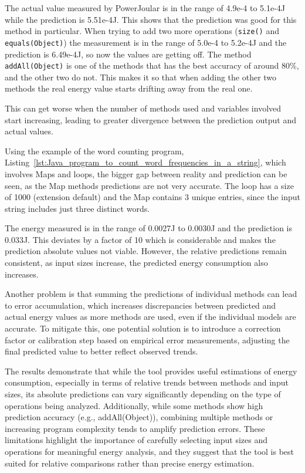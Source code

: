 The actual value measured by PowerJoular is in the range of 4.9e-4 to 5.1e-4J while the prediction is 5.51e-4J. This shows that the prediction was good for this method in particular.
When trying to add two more operations (\texttt{size()} and \texttt{equals(Object)}) the measurement is in the range of 5.0e-4 to 5.2e-4J and the prediction is 6.49e-4J, so now the values are getting off. The method \texttt{addAll(Object)} is one of the methods that has the best accuracy of around 80\%, and the other two do not. This makes it so that when adding the other two methods the real energy value starts drifting away from the real one.

This can get worse when the number of methods used and variables involved start increasing, leading to greater divergence between the prediction output and actual values. 

Using the example of the word counting program, Listing~\ref{lst:Java_program_to_count_word_frequencies_in_a_string}, which involves Maps and loops, the bigger gap between reality and prediction can be seen, as the Map methods predictions are not very accurate. The loop has a size of 1000 (extension default) and the Map contains 3 unique entries, since the input string includes just three distinct words.

The energy measured is in the range of 0.0027J to 0.0030J and the prediction is 0.033J. This deviates by a factor of 10 which is considerable and makes the prediction absolute values not viable. However, the relative predictions remain consistent, as input sizes increase, the predicted energy consumption also increases.

Another problem is that summing the predictions of individual methods can lead to error accumulation, which increases discrepancies between predicted and actual energy values as more methods are used, even if the individual models are accurate. To mitigate this, one potential solution is to introduce a correction factor or calibration step based on empirical error measurements, adjusting the final predicted value to better reflect observed trends.

The results demonstrate that while the tool provides useful estimations of energy consumption, especially in terms of relative trends between methods and input sizes, its absolute predictions can vary significantly depending on the type of operations being analyzed. Additionally, while some methods show high prediction accuracy (e.g., addAll(Object)), combining multiple methods or increasing program complexity tends to amplify prediction errors. These limitations highlight the importance of carefully selecting input sizes and operations for meaningful energy analysis, and they suggest that the tool is best suited for relative comparisons rather than precise energy estimation.


